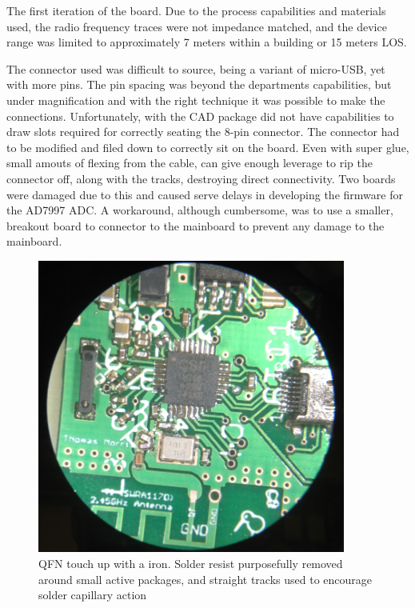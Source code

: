\documentclass[]{article}
\begin{document}
The first iteration of the board. Due to the process capabilities and materials used, the radio frequency traces were not impedance matched, and the device range was limited to approximately 7 meters within a building or 15 meters \ac{LOS}. 

The connector used was difficult to source, being a variant of micro-USB, yet with more pins. The pin spacing was beyond the departments capabilities, but under magnification and with the right technique it was possible to make the connections. Unfortunately, with the \ac{CAD} package did not have capabilities to draw slots required for correctly seating the 8-pin connector. The connector had to be modified and filed down to correctly sit on the board. Even with super glue, small amouts of flexing from the cable, can give enough leverage to rip the connector off, along with the tracks, destroying direct connectivity. Two boards were damaged due to this and caused serve delays in developing the firmware for the AD7997 \ac{ADC}. A workaround, although cumbersome, was to use a smaller, breakout board to connector to the mainboard to prevent any damage to the mainboard. 

\begin{figure}[htb]
	\begin{center}
		\includegraphics[width = 0.9\textwidth]{center}
	\end{center}
	\caption{\ac{QFN} touch up with a iron. Solder resist purposefully removed around small active packages, and straight tracks used to encourage solder capillary action}
	\label{fig:center}
\end{figure} 
\end{document}
